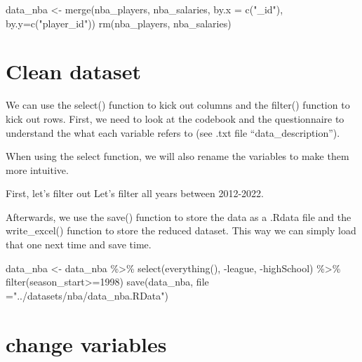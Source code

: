 \documentclass[
]{book}
\newenvironment{Shaded}{\begin{snugshade}}{\end{snugshade}}
\newcommand{\AttributeTok}[1]{\textcolor[rgb]{0.77,0.63,0.00}{#1}}
\newcommand{\DecValTok}[1]{\textcolor[rgb]{0.00,0.00,0.81}{#1}}
\newcommand{\FunctionTok}[1]{\textcolor[rgb]{0.00,0.00,0.00}{#1}}
\newcommand{\NormalTok}[1]{#1}
\newcommand{\OtherTok}[1]{\textcolor[rgb]{0.56,0.35,0.01}{#1}}
\newcommand{\SpecialCharTok}[1]{\textcolor[rgb]{0.00,0.00,0.00}{#1}}
\newcommand{\StringTok}[1]{\textcolor[rgb]{0.31,0.60,0.02}{#1}}
\begin{document}
\begin{Shaded}
\begin{Highlighting}[]
\NormalTok{data\_nba }\OtherTok{\textless{}{-}} \FunctionTok{merge}\NormalTok{(nba\_players, nba\_salaries, }\AttributeTok{by.x =} \FunctionTok{c}\NormalTok{(}\StringTok{"\_id"}\NormalTok{), }\AttributeTok{by.y=}\FunctionTok{c}\NormalTok{(}\StringTok{"player\_id"}\NormalTok{))}
\FunctionTok{rm}\NormalTok{(nba\_players, nba\_salaries)}
\end{Highlighting}
\end{Shaded}

\hypertarget{clean-dataset}{%
\section{Clean dataset}\label{clean-dataset}}

We can use the select() function to kick out columns and the filter() function to kick out rows. First, we need to look at the codebook and the questionnaire to understand the what each variable refers to (see .txt file ``data\_description'').

When using the select function, we will also rename the variables to make them more intuitive.

First, let's filter out Let's filter all years between 2012-2022.

Afterwards, we use the save() function to store the data as a .Rdata file and the write\_excel() function to store the reduced dataset. This way we can simply load that one next time and save time.

\begin{Shaded}
\begin{Highlighting}[]
\NormalTok{data\_nba }\OtherTok{\textless{}{-}}\NormalTok{ data\_nba }\SpecialCharTok{\%\textgreater{}\%}
        \FunctionTok{select}\NormalTok{(}\FunctionTok{everything}\NormalTok{(), }\SpecialCharTok{{-}}\NormalTok{league, }\SpecialCharTok{{-}}\NormalTok{highSchool) }\SpecialCharTok{\%\textgreater{}\%}
        \FunctionTok{filter}\NormalTok{(season\_start}\SpecialCharTok{\textgreater{}=}\DecValTok{1998}\NormalTok{)}
\FunctionTok{save}\NormalTok{(data\_nba, }\AttributeTok{file =}\StringTok{"../datasets/nba/data\_nba.RData"}\NormalTok{)}
\end{Highlighting}
\end{Shaded}

\hypertarget{change-variables}{%
\section{change variables}\label{change-variables}}
\end{document}
